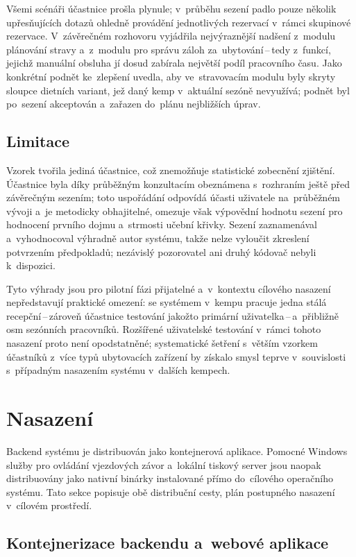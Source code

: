 Všemi scénáři účastnice prošla plynule; v~průběhu sezení padlo pouze několik upřesňujících dotazů ohledně provádění jednotlivých rezervací v~rámci skupinové rezervace.
V~závěrečném rozhovoru vyjádřila nejvýraznější nadšení z~modulu plánování stravy a~z~modulu pro správu záloh za~ubytování\,--\,tedy z~funkcí, jejichž manuální obsluha jí dosud zabírala největší podíl pracovního času.
Jako konkrétní podnět ke~zlepšení uvedla, aby ve~stravovacím modulu byly skryty sloupce dietních variant, jež daný kemp v~aktuální sezóně nevyužívá; podnět byl po~sezení akceptován a~zařazen do~plánu nejbližších úprav.

\subsection{Limitace}
\label{subsec:user-test-limits}
Vzorek tvořila jediná účastnice, což znemožňuje statistické zobecnění zjištění.
Účastnice byla díky průběžným konzultacím obeznámena s~rozhraním ještě před závěrečným sezením; toto uspořádání odpovídá účasti uživatele na~průběžném vývoji a~je metodicky obhajitelné, omezuje však výpovědní hodnotu sezení pro hodnocení prvního dojmu a~strmosti učební křivky.
Sezení zaznamenával a~vyhodnocoval výhradně autor systému, takže nelze vyloučit zkreslení potvrzením předpokladů; nezávislý pozorovatel ani druhý kódovač nebyli k~dispozici.

Tyto výhrady jsou pro pilotní fázi přijatelné a~v~kontextu cílového nasazení nepředstavují praktické omezení: se systémem v~kempu pracuje jedna stálá recepční\,--\,zároveň účastnice testování jakožto primární uživatelka\,--\,a~přibližně osm sezónních pracovníků.
Rozšířené uživatelské testování v~rámci tohoto nasazení proto není opodstatněné; systematické šetření s~větším vzorkem účastníků z~více typů ubytovacích zařízení by získalo smysl teprve v~souvislosti s~případným nasazením systému v~dalších kempech.

\section{Nasazení}
\label{sec:deployment}

Backend systému je distribuován jako kontejnerová aplikace.
Pomocné Windows služby pro ovládání vjezdových závor a~lokální tiskový server jsou naopak distribuovány jako nativní binárky instalované přímo do~cílového operačního systému.
Tato sekce popisuje obě distribuční cesty, plán postupného nasazení v~cílovém prostředí.

\subsection{Kontejnerizace backendu a~webové aplikace}
\label{subsec:deploy-containers}


